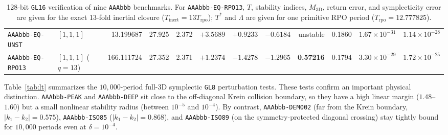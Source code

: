 \documentclass[11pt,a4paper]{article}
\begin{document}
\begin{table}[t]
\begin{tabular}{@{}llrrrrrrrrrr@{}}
    \texttt{AAAbbb-EQ-UNST}& $[1,1,1]$ & 13.199687 & 27.925 & 2.372 & $+3.5689$ & $+0.9233$ & $-0.6184$ & unstable & 0.1860 & $1.67\times10^{-31}$ & $1.14\times10^{-28}$ \\
    \texttt{AAAbbb-EQ-RPO13}& $[1,1,1]$ ($q\!=\!13$) & 166.111724 & 27.352 & 2.371 & $+1.2374$ & $-1.4278$ & $-1.2965$ & \textbf{0.57216} & 0.1794 & $3.30\times10^{-29}$ & $1.72\times10^{-25}$ \\
    \bottomrule
  \end{tabular}
  \caption{128-bit \texttt{GL16} verification of nine \texttt{AAAbbb} benchmarks. For \texttt{AAAbbb-EQ-RPO13}, $T$, stability indices, $M_{3\text{D}}$, return error, and symplecticity error are given for the exact 13-fold inertial closure ($T_{\text{inert}} = 13 T_{\text{rpo}}$); $T^*$ and $\Lambda$ are given for one primitive RPO period ($T_{\text{rpo}} = 12.777825$).}
  \label{tab:quad}
\end{table}

Table~\ref{tab:lt} summarizes the $10{,}000$-period full-3D symplectic \texttt{GL8} perturbation tests.
These tests confirm an important physical distinction.
\texttt{AAAbbb-PEAK} and \texttt{AAAbbb-DEEP} sit close to the off-diagonal Krein collision boundary, so they have a high linear margin ($1.48$--$1.60$) but a small nonlinear stability radius (between $10^{-5}$ and $10^{-4}$).
By contrast, \texttt{AAAbbb-DEM002} (far from the Krein boundary, $|k_1 - k_2| = 0.575$), \texttt{AAAbbb-ISO85} ($|k_1 - k_2| = 0.868$), and \texttt{AAAbbb-ISO89} (on the symmetry-protected diagonal crossing) stay tightly bound for $10{,}000$ periods even at $\delta = 10^{-4}$.
\end{document}
